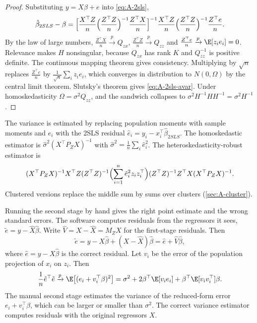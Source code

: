 \begin{proof}
Substituting $y = X\beta + e$ into \eqref{eq:A-2sls},
\begin{equation*}
\hat\beta_{2SLS} - \beta = \Bigl[\frac{X^\top Z}{n}\Bigl(\frac{Z^\top Z}{n}\Bigr)^{-1}\frac{Z^\top X}{n}\Bigr]^{-1}
\frac{X^\top Z}{n}\Bigl(\frac{Z^\top Z}{n}\Bigr)^{-1}\frac{Z^\top e}{n} .
\end{equation*}
By the law of large numbers, $\frac{Z^\top X}{n} \xrightarrow{p} Q_{zx}$, $\frac{Z^\top Z}{n} \xrightarrow{p} Q_{zz}$ and
$\frac{Z^\top e}{n} \xrightarrow{p} \E[z_ie_i] = 0$. Relevance makes $H$ nonsingular, because $Q_{zx}$ has rank $K$
and $Q_{zz}^{-1}$ is positive definite. The continuous mapping theorem gives consistency. Multiplying by
$\sqrt{n}$ replaces $\frac{Z^\top e}{n}$ by $\frac{1}{\sqrt{n}}\sum_iz_ie_i$, which converges in distribution to
$N(0, \Omega)$ by the central limit theorem. Slutsky's theorem gives \eqref{eq:A-2sls-avar}. Under
homoskedasticity $\Omega = \sigma^2Q_{zz}$, and the sandwich collapses to $\sigma^2H^{-1}HH^{-1} = \sigma^2H^{-1}$.
\end{proof}

The variance is estimated by replacing population moments with sample moments and $e_i$ with the 2SLS residual
$\hat e_i = y_i - x_i^\top\hat\beta_{2SLS}$. The homoskedastic estimator is $\hat\sigma^2(X^\top P_ZX)^{-1}$ with
$\hat\sigma^2 = \frac{1}{n}\sum_i\hat e_i^2$. The heteroskedasticity-robust estimator is
\begin{equation*}
(X^\top P_ZX)^{-1}X^\top Z(Z^\top Z)^{-1}\Bigl(\sum_{i=1}^n\hat e_i^2z_iz_i^\top\Bigr)(Z^\top Z)^{-1}Z^\top X(X^\top P_ZX)^{-1} .
\end{equation*}
Clustered versions replace the middle sum by sums over clusters (\cref{sec:A-cluster}).

Running the second stage by hand gives the right point estimate and the wrong standard errors. The software
computes residuals from the regressors it sees, $\tilde e = y - \hat X\hat\beta$. Write $\hat V = X - \hat X = M_ZX$
for the first-stage residuals. Then
\begin{equation*}
\tilde e = y - X\hat\beta + (X - \hat X)\hat\beta = \hat e + \hat V\hat\beta ,
\end{equation*}
where $\hat e = y - X\hat\beta$ is the correct residual. Let $v_i$ be the error of the population projection of
$x_i$ on $z_i$. Then
\begin{equation*}
\frac{1}{n}\tilde e^\top\tilde e \xrightarrow{p} \E\bigl[(e_i + v_i^\top\beta)^2\bigr]
= \sigma^2 + 2\beta^\top\E[v_ie_i] + \beta^\top\E[v_iv_i^\top]\beta .
\end{equation*}
The manual second stage estimates the variance of the reduced-form error $e_i + v_i^\top\beta$, which can be
larger or smaller than $\sigma^2$. The correct variance estimator computes residuals with the original
regressors $X$.

